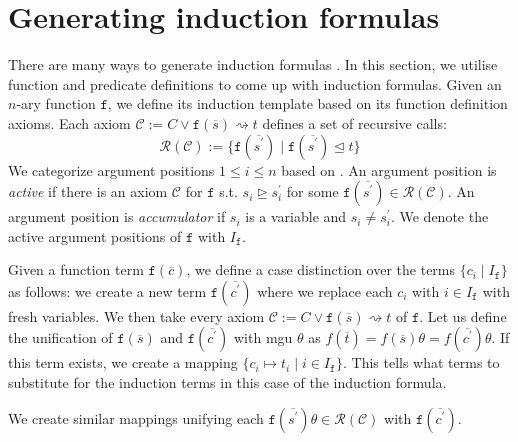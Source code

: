 
\section{Generating induction formulas}

There are many ways to generate induction formulas \cite{aclhandbook,bundychapter,cruanes,hipspec,hipster,isaplanner}. In this section, we utilise function and predicate definitions to come up with induction formulas. Given an $n$-ary function $\mathtt{f}$, we define its induction template based on its function definition axioms. Each axiom $\mathcal{C}:=C\lor \mathtt{f}(\overline{s}) \rightsquigarrow t$ defines a set of recursive calls:
$$\mathcal{R}(\mathcal{C}):=\{\mathtt{f}(\overline{s^\prime})\mid \mathtt{f}(\overline{s^\prime})\trianglelefteq t\}$$
We categorize argument positions $1\le i\le n$ based on \cite{cruanes}. An argument position is \textit{active} if there is an axiom $\mathcal{C}$ for $\mathtt{f}$ s.t. $s_i \trianglerighteq s^\prime_i$ for some $\mathtt{f}(\overline{s^\prime})\in\mathcal{R}(\mathcal{C})$. An argument position is \textit{accumulator} if $s_i$ is a variable and $s_i\neq s^\prime_i$. We denote the active argument positions of $\mathtt{f}$ with $I_\mathtt{f}$.


Given a function term $\mathtt{f}(\overline{c})$, we define a case distinction over the terms $\{c_i\mid I_\mathtt{f}\}$ as follows: we create a new term $\mathtt{f}(\overline{c^\prime})$ where we replace each $c_i$ with $i\in I_\mathtt{f}$ with fresh variables. We then take every axiom $\mathcal{C}:=C\lor \mathtt{f}(\overline{s}) \rightsquigarrow t$ of $\mathtt{f}$. Let us define the unification of $\mathtt{f}(\overline{s})$ and $\mathtt{f}(\overline{c^\prime})$ with mgu $\theta$ as $f(\overline{t})=f(\overline{s})\theta=f(\overline{c^\prime})\theta$. If this term exists, we create a mapping $\{c_i\mapsto t_i\mid i\in I_\mathtt{f}\}$. This tells what terms to substitute for the induction terms in this case of the induction formula.

We create similar mappings unifying each $\mathtt{f}(\overline{s^\prime})\theta\in\mathcal{R}(\mathcal{C})$ with $\mathtt{f}(\overline{c^\prime})$.


